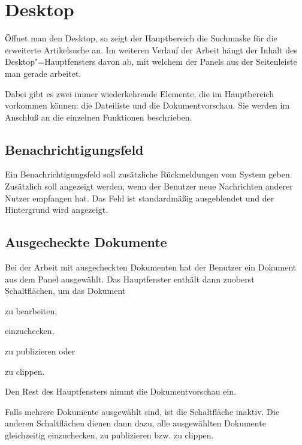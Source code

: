 %


\chapter{Desktop}\label{desktop}

Öffnet man den Desktop, so zeigt der Hauptbereich die Suchmaske für die
erweiterte Artikelsuche an. Im weiteren Verlauf der Arbeit hängt der Inhalt
des Desktop"=Hauptfensters davon ab, mit welchem der Panels aus der
Seitenleiste man gerade arbeitet.

Dabei gibt es zwei immer wiederkehrende Elemente, die im Hauptbereich
vorkommen können: die Dateiliste und die Dokumentvorschau. Sie werden im
Anschluß an die einzelnen Funktionen beschrieben.

\section{Benachrichtigungsfeld} \label{notifications}


Ein Benachrichtigungsfeld soll zusätzliche Rückmeldungen vom System geben.
Zusätzlich soll angezeigt werden, wenn der Benutzer neue Nachrichten anderer
Nutzer empfangen hat. Das Feld ist standardmäßig ausgeblendet und der
Hintergrund wird angezeigt. 

\section{Ausgecheckte Dokumente} \label{sec-cico}

Bei der Arbeit mit ausgecheckten Dokumenten hat der Benutzer ein Dokument aus
dem Panel  ausgewählt. Das Hauptfenster
enthält dann zuoberst Schaltflächen, um das Dokument
\begin{compactitem}
\item zu bearbeiten,
\item einzuchecken,
\item zu publizieren oder
\item zu clippen.
\end{compactitem}
%
Den Rest des Hauptfensters nimmt die Dokumentvorschau ein.

Falls mehrere Dokumente ausgewählt sind, ist die Schaltfläche
 inaktiv. Die anderen Schaltflächen dienen dann dazu,
alle ausgewählten Dokumente gleichzeitig einzuchecken, zu publizieren bzw. zu
clippen.

